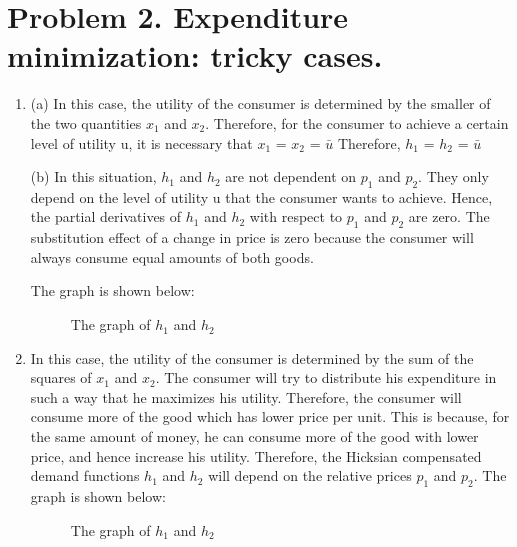 \documentclass[UTF8,titlepage]{article}
\numberwithin{figure}{section}
\begin{document}
\section{Problem 2. Expenditure minimization: tricky cases.}
\begin{enumerate}
    \item (a) In this case, the utility of the consumer is determined by the smaller of the two quantities $x_1$ and $x_2$. Therefore, for the consumer to achieve a certain level of utility u, it is necessary that $x_1$ = $x_2$ = $\bar{u}$ Therefore, $h_1$ = $h_2$ = $\bar{u}$

(b) In this situation, $h_1$ and $h_2$ are not dependent on $p_1$ and $p_2$. They only depend on the level of utility u that the consumer wants to achieve. Hence, the partial derivatives of $h_1$ and $h_2$ with respect to $p_1$ and $p_2$ are zero. The substitution effect of a change in price is zero because the consumer will always consume equal amounts of both goods.

The graph is shown below:
\begin{figure}[H]
\centering
 \caption{The graph of $h_1$ and $h_2$}
 \label{}
\end{figure}
    \item In this case, the utility of the consumer is determined by the sum of the squares of $x_1$ and $x_2$. The consumer will try to distribute his expenditure in such a way that he maximizes his utility. Therefore, the consumer will consume more of the good which has lower price per unit. This is because, for the same amount of money, he can consume more of the good with lower price, and hence increase his utility. Therefore, the Hicksian compensated demand functions $h_1$ and $h_2$ will depend on the relative prices $p_1$ and $p_2$.
The graph is shown below:
\begin{figure}[H]
\centering
 \caption{The graph of $h_1$ and $h_2$}
 \label{}
\end{figure}
\end{enumerate}
\end{document}
